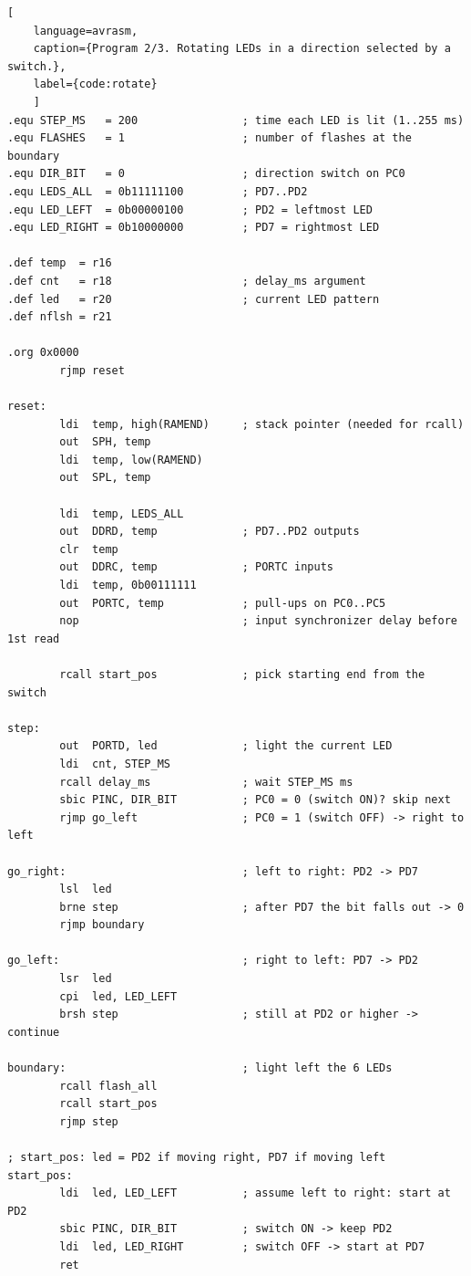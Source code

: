 \documentclass[11pt]{article}
\begin{document}
\begin{lstlisting}[
    language=avrasm,
    caption={Program 2/3. Rotating LEDs in a direction selected by a switch.},
    label={code:rotate}
    ]
.equ STEP_MS   = 200                ; time each LED is lit (1..255 ms)
.equ FLASHES   = 1                  ; number of flashes at the boundary
.equ DIR_BIT   = 0                  ; direction switch on PC0
.equ LEDS_ALL  = 0b11111100         ; PD7..PD2
.equ LED_LEFT  = 0b00000100         ; PD2 = leftmost LED
.equ LED_RIGHT = 0b10000000         ; PD7 = rightmost LED

.def temp  = r16
.def cnt   = r18                    ; delay_ms argument
.def led   = r20                    ; current LED pattern
.def nflsh = r21

.org 0x0000
        rjmp reset

reset:
        ldi  temp, high(RAMEND)     ; stack pointer (needed for rcall)
        out  SPH, temp
        ldi  temp, low(RAMEND)
        out  SPL, temp

        ldi  temp, LEDS_ALL
        out  DDRD, temp             ; PD7..PD2 outputs
        clr  temp
        out  DDRC, temp             ; PORTC inputs
        ldi  temp, 0b00111111
        out  PORTC, temp            ; pull-ups on PC0..PC5
        nop                         ; input synchronizer delay before 1st read

        rcall start_pos             ; pick starting end from the switch

step:
        out  PORTD, led             ; light the current LED
        ldi  cnt, STEP_MS
        rcall delay_ms              ; wait STEP_MS ms
        sbic PINC, DIR_BIT          ; PC0 = 0 (switch ON)? skip next
        rjmp go_left                ; PC0 = 1 (switch OFF) -> right to left

go_right:                           ; left to right: PD2 -> PD7
        lsl  led
        brne step                   ; after PD7 the bit falls out -> 0
        rjmp boundary

go_left:                            ; right to left: PD7 -> PD2
        lsr  led
        cpi  led, LED_LEFT
        brsh step                   ; still at PD2 or higher -> continue

boundary:                           ; light left the 6 LEDs
        rcall flash_all
        rcall start_pos
        rjmp step

; start_pos: led = PD2 if moving right, PD7 if moving left
start_pos:
        ldi  led, LED_LEFT          ; assume left to right: start at PD2
        sbic PINC, DIR_BIT          ; switch ON -> keep PD2
        ldi  led, LED_RIGHT         ; switch OFF -> start at PD7
        ret


\end{lstlisting}
\end{document}

